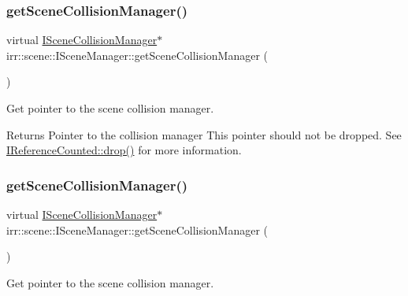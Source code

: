 \subsubsection{\texorpdfstring{get\+Scene\+Collision\+Manager()}{getSceneCollisionManager()}\hspace{0.1cm}{\footnotesize\ttfamily [1/2]}}
{\footnotesize\ttfamily virtual \hyperlink{classirr_1_1scene_1_1ISceneCollisionManager}{I\+Scene\+Collision\+Manager}$\ast$ irr\+::scene\+::\+I\+Scene\+Manager\+::get\+Scene\+Collision\+Manager (\begin{DoxyParamCaption}{ }\end{DoxyParamCaption})\hspace{0.3cm}{\ttfamily [pure virtual]}}



Get pointer to the scene collision manager. 

\begin{DoxyReturn}{Returns}
Pointer to the collision manager This pointer should not be dropped. See \hyperlink{classirr_1_1IReferenceCounted_a03856a09355b89d178090c4a5f738543}{I\+Reference\+Counted\+::drop()} for more information. 
\end{DoxyReturn}
\mbox{\label{classirr_1_1scene_1_1ISceneManager_a433b65bfc974d069a1dc2fc296b23d9b}} 
\subsubsection{\texorpdfstring{get\+Scene\+Collision\+Manager()}{getSceneCollisionManager()}\hspace{0.1cm}{\footnotesize\ttfamily [2/2]}}
{\footnotesize\ttfamily virtual \hyperlink{classirr_1_1scene_1_1ISceneCollisionManager}{I\+Scene\+Collision\+Manager}$\ast$ irr\+::scene\+::\+I\+Scene\+Manager\+::get\+Scene\+Collision\+Manager (\begin{DoxyParamCaption}{ }\end{DoxyParamCaption})\hspace{0.3cm}{\ttfamily [pure virtual]}}



Get pointer to the scene collision manager. 

